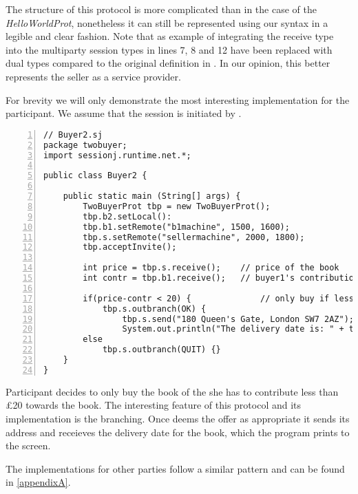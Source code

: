The structure of this protocol is more complicated than in the case of the \textit{HelloWorldProt}, nonetheless it can still be represented using our syntax in a legible and clear fashion. Note that as example of integrating the receive type into the multiparty session types in lines 7, 8 and 12 have been replaced with dual types compared to the original definition in \cite{multiparty_sess_types}. In our opinion, this better represents the seller as a service provider.  

For brevity we will only demonstrate the most interesting implementation for the  participant. We assume that the session is initiated by . 

\begin{lstlisting}[basicstyle=\LISTINGSTYLE, numbers=left, caption=Global Declaration of \textit{HelloWorldProt}]
// Buyer2.sj
package twobuyer; 
import sessionj.runtime.net.*;
 
public class Buyer2 {
	
	public static main (String[] args) {
		TwoBuyerProt tbp = new TwoBuyerProt();
		tbp.b2.setLocal():
		tbp.b1.setRemote("b1machine", 1500, 1600);
		tbp.s.setRemote("sellermachine", 2000, 1800);
		tbp.acceptInvite();
		
		int price = tbp.s.receive(); 	// price of the book
		int contr = tbp.b1.receive();	// buyer1's contribution
					
		if(price-contr < 20) {				// only buy if less than 20 pounds needed from me 				
			tbp.s.outbranch(OK) {
				tbp.s.send("180 Queen's Gate, London SW7 2AZ");
				System.out.println("The delivery date is: " + tbp.s.receive()); }
		else
			tbp.s.outbranch(QUIT) {}				
	} 
}
\end{lstlisting}

Participant  decides to only buy the book of the she has to contribute less than \pounds 20 towards the book. The interesting feature of this protocol and its implementation is the branching. Once  deems the offer as appropriate it sends its address and receieves the delivery date for the book, which the program prints to the screen.

The implementations for other parties follow a similar pattern and can be found in \autoref{appendixA}.